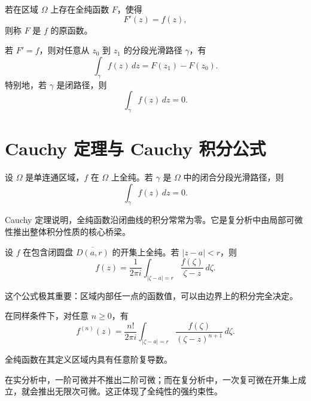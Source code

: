 \begin{definition}[原函数]
若在区域 $\Omega$ 上存在全纯函数 $F$，使得
\[
    F'(z)=f(z),
\]
则称 $F$ 是 $f$ 的原函数。
\end{definition}

\begin{theorem}[复线积分基本定理]
若 $F'=f$，则对任意从 $z_0$ 到 $z_1$ 的分段光滑路径 $\gamma$，有
\[
    \int_\gamma f(z)\,dz=F(z_1)-F(z_0).
\]
特别地，若 $\gamma$ 是闭路径，则
\[
    \int_\gamma f(z)\,dz=0.
\]
\end{theorem}

\section{Cauchy 定理与 Cauchy 积分公式}

\begin{theorem}
设 $\Omega$ 是单连通区域，$f$ 在 $\Omega$ 上全纯。若 $\gamma$ 是 $\Omega$ 中的闭合分段光滑路径，则
\[
    \int_\gamma f(z)\,dz=0.
\]
\end{theorem}

\begin{remark}
Cauchy 定理说明，全纯函数沿闭曲线的积分常常为零。它是复分析中由局部可微性推出整体积分性质的核心桥梁。
\end{remark}

\begin{theorem}
设 $f$ 在包含闭圆盘 $\overline{D(a,r)}$ 的开集上全纯。若 $|z-a|<r$，则
\[
    f(z)=\frac1{2\pi i}\int_{|\zeta-a|=r}\frac{f(\zeta)}{\zeta-z}\,d\zeta.
\]
\end{theorem}

这个公式极其重要：区域内部任一点的函数值，可以由边界上的积分完全决定。

\begin{theorem}
在同样条件下，对任意 $n\ge0$，有
\[
    f^{(n)}(z)=\frac{n!}{2\pi i}\int_{|\zeta-a|=r}\frac{f(\zeta)}{(\zeta-z)^{n+1}}\,d\zeta.
\]
\end{theorem}

\begin{corollary}
全纯函数在其定义区域内具有任意阶复导数。
\end{corollary}

\begin{remark}
在实分析中，一阶可微并不推出二阶可微；而在复分析中，一次复可微在开集上成立，就会推出无限次可微。这正体现了全纯性的强约束性。
\end{remark}

